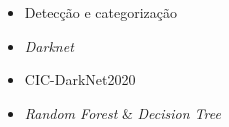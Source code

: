 \begin{frame}

    \begin{itemize}
      \item Detecção e categorização \pause 
      \item \emph{Darknet} \pause 
      \item CIC-DarkNet2020 \pause 
      \item \emph{Random Forest} \& \emph{Decision Tree} 
    \end{itemize}

\end{frame}